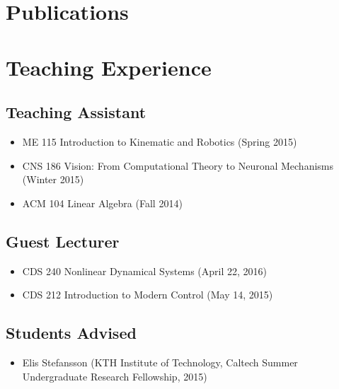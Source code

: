 \documentclass[letterpaper]{article}
\begin{document}
\section*{Publications}

\printbibliography[heading=subbibliography,title={Journal Articles},type=article]
\printbibliography[heading=subbibliography,title={Refereed Conference Papers},type=inproceedings]
\printbibliography[heading=subbibliography,title={Posters/Abstracts},type=misc]
\printbibliography[heading=subbibliography,title={Master's Thesis},type=thesis]

\newpage

\section*{Teaching Experience}

\subsection*{Teaching Assistant}
\begin{itemize}
\item ME 115 Introduction to Kinematic and Robotics (Spring 2015) 
\item CNS 186 Vision: From Computational Theory to Neuronal Mechanisms (Winter 2015)
\item ACM 104 Linear Algebra (Fall 2014)
\end{itemize}

\subsection*{Guest Lecturer}
\begin{itemize}
\item CDS 240 Nonlinear Dynamical Systems (April 22, 2016)
\item CDS 212 Introduction to Modern Control (May 14, 2015)
\end{itemize}


\subsection*{Students Advised}
\begin{itemize}
\item Elis Stefansson (KTH Institute of Technology, Caltech Summer Undergraduate Research Fellowship, 2015)
\end{itemize}
\end{document}
